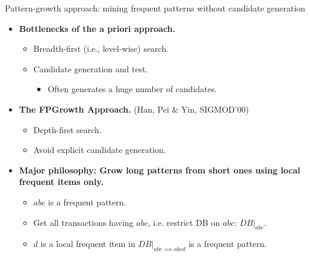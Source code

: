 \documentclass[aspectratio=169,t,xcolor=dvipsnames]{beamer}
\begin{document}
 {
    \begin{frame}{Pattern-growth approach: mining frequent patterns without candidate generation}
        \begin{itemize}
            \item \textbf{Bottlenecks of the a priori approach.}
            \begin{itemize}
                \item Breadth-first (i.e., level-wise) search.
                \item Candidate generation and test.
                \begin{itemize}
                    \item Often generates a huge number of candidates.
                \end{itemize}
            \end{itemize}
            \item \textbf{The FPGrowth Approach.} (Han, Pei \& Yin, SIGMOD'00)
            \begin{itemize}
                \item Depth-first search.
                \item Avoid explicit candidate generation.
            \end{itemize}
            \item \textbf{Major philosophy: Grow long patterns from short ones using local frequent items only.}
            \begin{itemize}
                \item $abc$ is a frequent pattern.
                \item Get all transactions having $abc$, i.e. restrict DB on $abc$: $DB|_{abc}$.
                \item $d$ is a local frequent item in $DB|_{abc \implies abcd}$ is a frequent pattern.
            \end{itemize}
        \end{itemize}
    \end{frame}
  }
\end{document}
